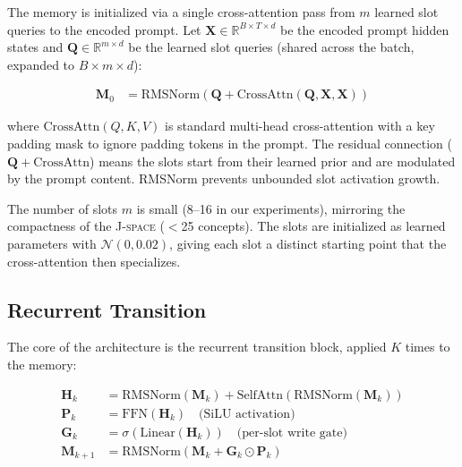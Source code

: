 \documentclass[11pt,a4paper]{article}
\newcommand{\R}{\mathbb{R}}
\newcommand{\jspace}{\textsc{J-space}}
\begin{document}
The memory is initialized via a single cross-attention pass from $m$ learned slot queries to the encoded prompt. Let $\mathbf{X} \in \R^{B \times T \times d}$ be the encoded prompt hidden states and $\mathbf{Q} \in \R^{m \times d}$ be the learned slot queries (shared across the batch, expanded to $B \times m \times d$):

\begin{align}
    \mathbf{M}_0 &= \text{RMSNorm}\!\left(\mathbf{Q} + \text{CrossAttn}(\mathbf{Q}, \mathbf{X}, \mathbf{X})\right)
\end{align}

where $\text{CrossAttn}(Q, K, V)$ is standard multi-head cross-attention with a key padding mask to ignore padding tokens in the prompt. The residual connection ($\mathbf{Q} + \text{CrossAttn}$) means the slots start from their learned prior and are modulated by the prompt content. RMSNorm prevents unbounded slot activation growth.

The number of slots $m$ is small (8--16 in our experiments), mirroring the compactness of the \jspace{} ($<$25 concepts). The slots are initialized as learned parameters with $\mathcal{N}(0, 0.02)$, giving each slot a distinct starting point that the cross-attention then specializes.

\subsection{Recurrent Transition}
\label{sec:transition}

The core of the architecture is the recurrent transition block, applied $K$ times to the memory:

\begin{align}
    \mathbf{H}_k &= \text{RMSNorm}(\mathbf{M}_k) + \text{SelfAttn}(\text{RMSNorm}(\mathbf{M}_k)) \\
    \mathbf{P}_k &= \text{FFN}(\mathbf{H}_k) \quad \text{(SiLU activation)} \\
    \mathbf{G}_k &= \sigma(\text{Linear}(\mathbf{H}_k)) \quad \text{(per-slot write gate)} \\
    \mathbf{M}_{k+1} &= \text{RMSNorm}(\mathbf{M}_k + \mathbf{G}_k \odot \mathbf{P}_k)
\end{align}
\end{document}

